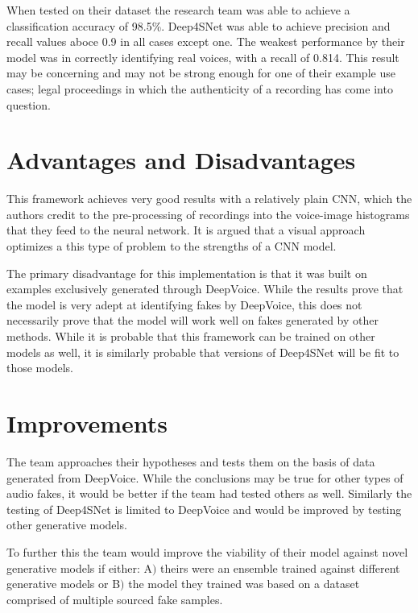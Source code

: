 \documentclass[]{article}
\begin{document}
When tested on their dataset the research team was able to achieve a classification accuracy of 98.5\%.
Deep4SNet was able to achieve precision and recall values aboce 0.9 in all cases except one.
The weakest performance by their model was in correctly identifying real voices, with a recall of 0.814.
This result may be concerning and may not be strong enough for one of their example use cases;
legal proceedings in which the authenticity of a recording has come into question.

\section{Advantages and Disadvantages}

This framework achieves very good results with a relatively plain CNN, 
which the authors credit to the pre-processing of recordings into the voice-image histograms that they feed to the neural network.
It is argued that a visual approach optimizes a this type of problem to the strengths of a CNN model.

The primary disadvantage for this implementation is that it was built on examples exclusively generated through DeepVoice.
While the results prove that the model is very adept at identifying fakes by DeepVoice, 
this does not necessarily prove that the model will work well on fakes generated by other methods.
While it is probable that this framework can be trained on other models as well, 
it is similarly probable that versions of Deep4SNet will be fit to those models.

\section{Improvements}

The team approaches their hypotheses and tests them on the basis of data generated from DeepVoice.
While the conclusions may be true for other types of audio fakes, it would be better if the team had tested others as well.
Similarly the testing of Deep4SNet is limited to DeepVoice and would be improved by testing other generative models.

To further this the team would improve the viability of their model against novel generative models if either:
A$)$ theirs were an ensemble trained against different generative models or 
B$)$ the model they trained was based on a dataset comprised of multiple sourced fake samples.

\clearpage


\end{document}
